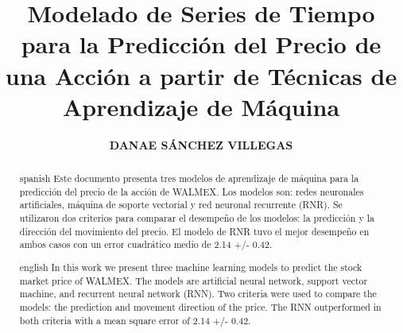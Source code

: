 \documentclass{tesisITAM}
\title{Modelado de Series de Tiempo para la Predicción del Precio de una Acción a partir de Técnicas de Aprendizaje de Máquina}
\author{\textbf{DANAE SÁNCHEZ VILLEGAS}}
\begin{document}
	\maketitle
	\publicationrights


	\begin{abstract}{spanish}
		Este documento presenta tres modelos de aprendizaje de máquina para la predicción del precio de la acción de WALMEX. Los modelos son: redes neuronales artificiales, máquina de soporte vectorial y red neuronal recurrente (RNR). Se utilizaron dos criterios para comparar el desempeño de los modelos: la predicción y la dirección del movimiento del precio. El modelo de RNR tuvo el mejor desempeño en ambos casos con un error cuadrático medio de 2.14 +/- 0.42.
	\end{abstract}

	\begin{abstract}{english}
		In this work we present three machine learning models to predict the stock market price of WALMEX. The models are artificial neural network, support vector machine, and recurrent neural network (RNN). Two criteria were used to compare the models: the prediction and movement direction of the price. The RNN outperformed in both criteria with a mean square error of 2.14 +/- 0.42. 
	\end{abstract}


	\setcounter{page}{1}

	\tableofcontents
	\listoffigures
	\listoftables
	\newpage

	\setcounter{page}{1}

	 
	
    
    
    
    



 

	\appendix
\end{document}
